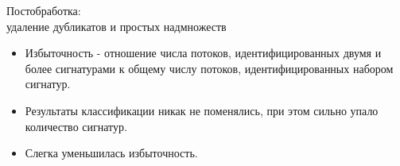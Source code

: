\documentclass[10pt]{beamer}
\begin{document}
\begin{frame}{Постобработка: \\ удаление дубликатов и простых надмножеств}

    \begin{table}[]
    \end{table}

    \begin{itemize}
        \item Избыточность - отношение числа потоков, идентифицированных двумя и более сигнатурами к общему числу потоков, идентифицированных набором сигнатур.
        \item Результаты классификации никак не поменялись, при этом сильно упало количество сигнатур.
        \item Слегка уменьшилась избыточность.
    \end{itemize}
\end{frame}
\end{document}
